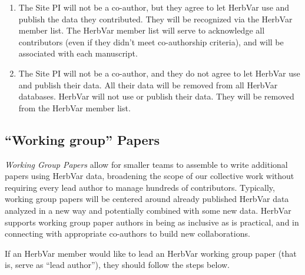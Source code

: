 \documentclass[
  letterpaper,
  oneside,
  open=any]{scrbook}
\begin{document}
\begin{enumerate}
\def\labelenumi{\arabic{enumi}.}
\item
  The Site PI will not be a co-author, but they agree to let HerbVar use
  and publish the data they contributed. They will be recognized via the
  HerbVar member list. The HerbVar member list will serve to acknowledge
  all contributors (even if they didn't meet co-authorship criteria),
  and will be associated with each manuscript.
\item
  The Site PI will not be a co-author, and they do not agree to let
  HerbVar use and publish their data. All their data will be removed
  from all HerbVar databases. HerbVar will not use or publish their
  data. They will be removed from the HerbVar member list.
\end{enumerate}

\subsection{``Working group'' Papers}\label{working-group-papers}

\emph{Working Group Papers} allow for smaller teams to assemble to write
additional papers using HerbVar data, broadening the scope of our
collective work without requiring every lead author to manage hundreds
of contributors. Typically, working group papers will be centered around
already published HerbVar data analyzed in a new way and potentially
combined with some new data. HerbVar supports working group paper
authors in being as inclusive as is practical, and in connecting with
appropriate co-authors to build new collaborations.

If an HerbVar member would like to lead an HerbVar working group paper
(that is, serve as ``lead author''), they should follow the steps below.
\end{document}
